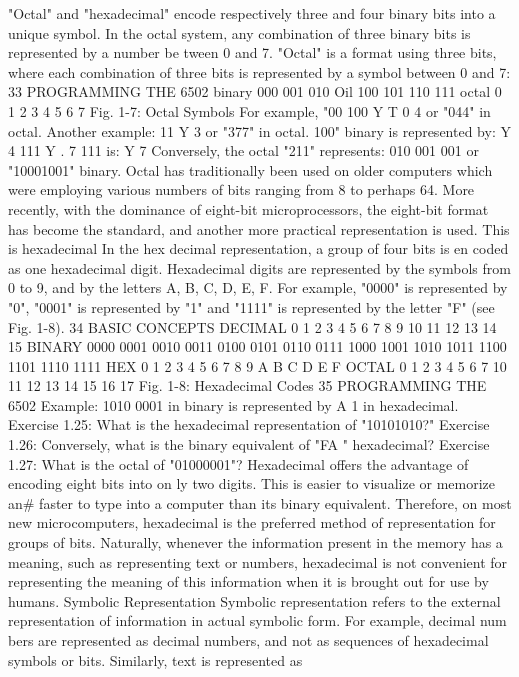 \documentclass{book}
\begin{document}
"Octal" and "hexadecimal" encode respectively three and four
binary bits into a unique symbol. In the octal system, any
combination of three binary bits is represented by a number be
tween 0 and 7.
"Octal" is a format using three bits, where each combination of
three bits is represented by a symbol between 0 and 7:
33
PROGRAMMING THE 6502
binary
000
001
010
Oil
100
101
110
111
octal
0
1
2
3
4
5
6
7
Fig. 1-7: Octal Symbols
For example, "00 100
Y T
0 4
or "044" in octal.
Another example: 11
Y
3
or "377" in octal.
100" binary is represented by:
Y
4
111
Y
. 7
111 is:
Y
7
Conversely, the octal "211" represents:
010 001 001
or "10001001" binary.
Octal has traditionally been used on older computers which were
employing various numbers of bits ranging from 8 to perhaps 64.
More recently, with the dominance of eight-bit microprocessors,
the eight-bit format has become the standard, and another more
practical representation is used. This is hexadecimal
In the hex decimal representation, a group of four bits is en
coded as one hexadecimal digit. Hexadecimal digits are
represented by the symbols from 0 to 9, and by the letters A, B, C,
D, E, F. For example, "0000" is represented by "0", "0001" is
represented by "1" and "1111" is represented by the letter "F"
(see Fig. 1-8).
34
BASIC CONCEPTS
DECIMAL
0
1
2
3
4
5
6
7
8
9
10
11
12
13
14
15
BINARY
0000
0001
0010
0011
0100
0101
0110
0111
1000
1001
1010
1011
1100
1101
1110
1111
HEX
0
1
2
3
4
5
6
7
8
9
A
B
C
D
E
F
OCTAL
0
1
2
3
4
5
6
7
10
11
12
13
14
15
16
17
Fig. 1-8: Hexadecimal Codes
35
PROGRAMMING THE 6502
Example: 1010 0001 in binary is represented by
A 1 in hexadecimal.
Exercise 1.25: What is the hexadecimal representation of
"10101010?"
Exercise 1.26: Conversely, what is the binary equivalent of "FA "
hexadecimal?
Exercise 1.27: What is the octal of "01000001"?
Hexadecimal offers the advantage of encoding eight bits into on
ly two digits. This is easier to visualize or memorize an# faster to
type into a computer than its binary equivalent. Therefore, on
most new microcomputers, hexadecimal is the preferred method of
representation for groups of bits.
Naturally, whenever the information present in the memory has
a meaning, such as representing text or numbers, hexadecimal is
not convenient for representing the meaning of this information
when it is brought out for use by humans.
Symbolic Representation
Symbolic representation refers to the external representation of
information in actual symbolic form. For example, decimal num
bers are represented as decimal numbers, and not as sequences of
hexadecimal symbols or bits. Similarly, text is represented as
\end{document}
